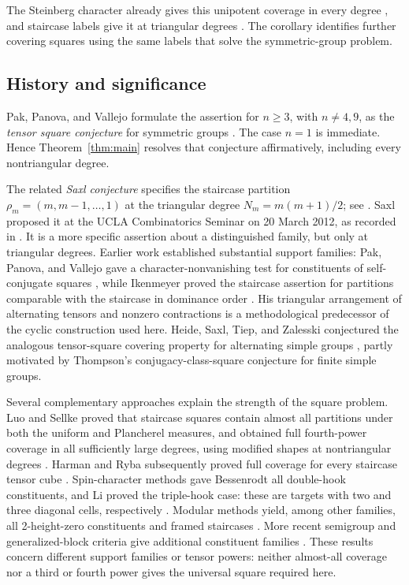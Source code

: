 The Steinberg character already gives this unipotent coverage in every
degree \cite[Proposition~33]{Letellier}, and staircase labels give it
at triangular degrees \cite[Theorem~1.1]{LetellierNam}. The corollary
identifies further covering squares using the same labels that solve
the symmetric-group problem.

\subsection{History and significance}

Pak, Panova, and Vallejo formulate the assertion for $n\ge3$, with
$n\ne4,9$, as the \emph{tensor square conjecture} for symmetric groups
\cite[Conjecture~1.1]{PPV}. The case $n=1$ is immediate. Hence
Theorem~\ref{thm:main} resolves that conjecture affirmatively, including
every nontriangular degree.

The related \emph{Saxl conjecture} specifies the staircase partition
$\rho_m=(m,m-1,\ldots,1)$ at the triangular degree
$N_m=m(m+1)/2$; see \cite[Conjecture~1.2]{PPV}.
Saxl proposed it at the UCLA Combinatorics Seminar on 20 March 2012,
as recorded in \cite[Footnote~2]{PPV}.
It is a more specific assertion about a distinguished family, but only
at triangular degrees. Earlier work established substantial support
families: Pak, Panova, and Vallejo gave a character-nonvanishing test for
constituents of self-conjugate squares \cite[Lemma~1.3]{PPV},
while Ikenmeyer proved the staircase assertion for partitions comparable
with the staircase in dominance order \cite[Theorem~2.1]{Ikenmeyer}.
His triangular arrangement of alternating tensors and nonzero contractions
\cite[Sections~3--5]{Ikenmeyer} is a methodological predecessor of the
cyclic construction used here.
Heide, Saxl, Tiep, and Zalesski conjectured the analogous tensor-square
covering property for alternating simple groups \cite[Remark~1.3(3)]{HSTZ},
partly motivated by Thompson's conjugacy-class-square conjecture for
finite simple groups.

Several complementary approaches explain the strength of the square
problem. Luo and Sellke proved that staircase squares contain almost all
partitions under both the uniform and Plancherel measures, and obtained
full fourth-power coverage in all sufficiently large degrees, using
modified shapes at nontriangular degrees
\cite[Theorems~1.4--1.6]{LuoSellke}. Harman and Ryba subsequently proved
full coverage for every staircase tensor cube \cite[Theorem~1.1]{HarmanRyba}.
Spin-character methods gave Bessenrodt all double-hook constituents,
and Li proved the triple-hook case: these are targets with two and
three diagonal cells, respectively
\cite[Theorem~4.10]{Bessenrodt}\cite[Theorem~4.22]{Li}.
Modular methods yield, among other families, all
2-height-zero constituents and framed staircases
\cite[Theorems~5.2 and~5.5]{BessenrodtBowmanSutton}.
More recent semigroup and generalized-block criteria give additional
constituent families \cite[Theorem~1.6]{Ebrahimi}.
These results concern different support families or tensor powers:
neither almost-all coverage nor a third or fourth power gives the
universal square required here.

